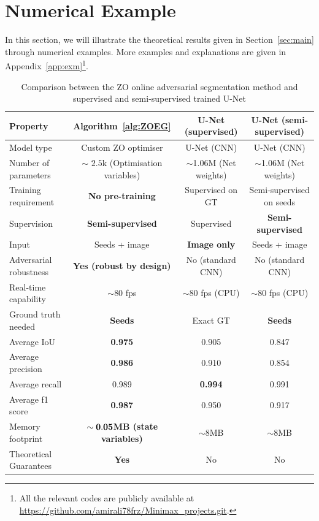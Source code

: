 \documentclass{article}
\theoremstyle{plain}
\theoremstyle{definition}
\theoremstyle{remark}
\begin{document}
\section{Numerical Example}\label{sec:exm}
In this section, we will illustrate the theoretical results given in Section~\ref{sec:main} through numerical examples. More examples and explanations are given in Appendix~\ref{app:exm}\footnote{All the relevant codes are publicly available at \url{https://github.com/amirali78frz/Minimax_projects.git}.}.  

\begin{table}[t]
\centering
\caption{Comparison between the ZO online adversarial segmentation method and supervised and semi-supervised trained U-Net}
\label{tab:method_comparison}
\begin{tabular}{lccc}
\toprule
\textbf{Property} & \textbf{Algorithm~\ref{alg:ZOEG}} & \textbf{U-Net (supervised)} & \textbf{U-Net (semi-supervised)} \\
\midrule
Model type & Custom ZO optimiser & U-Net (CNN) & U-Net (CNN)  \\
Number of parameters & $\sim$ $2.5$k (Optimisation variables) & $\sim$1.06M (Net weights) & $\sim$1.06M (Net weights) \\
Training requirement & \textbf{No pre-training} & Supervised on GT & Semi-supervised on seeds \\
Supervision & \textbf{Semi-supervised} & Supervised & \textbf{Semi-supervised} \\
Input & Seeds + image & \textbf{Image only} & Seeds + image \\
Adversarial robustness & \textbf{Yes (robust by design)} & No (standard CNN) & No (standard CNN) \\
Real-time capability & $\sim$80 fps & $\sim$80 fps (CPU) & $\sim$80 fps (CPU) \\
Ground truth needed & \textbf{Seeds} & Exact GT & \textbf{Seeds} \\
Average IoU & \textbf{0.975} & 0.905 &  0.847\\
Average precision & \textbf{0.986} & 0.910 & 0.854 \\
Average recall & 0.989 & \textbf{0.994} &  0.991\\
Average f1 score & \textbf{0.987} & 0.950 &0.917\\
Memory footprint & \textbf{$\bold{\sim0.05}$MB (state variables)} & $\sim 8$MB & $\sim 8$MB\\
Theoretical Guarantees & \textbf{Yes} & No & No\\
\bottomrule
\end{tabular}
\end{table}
\end{document}
